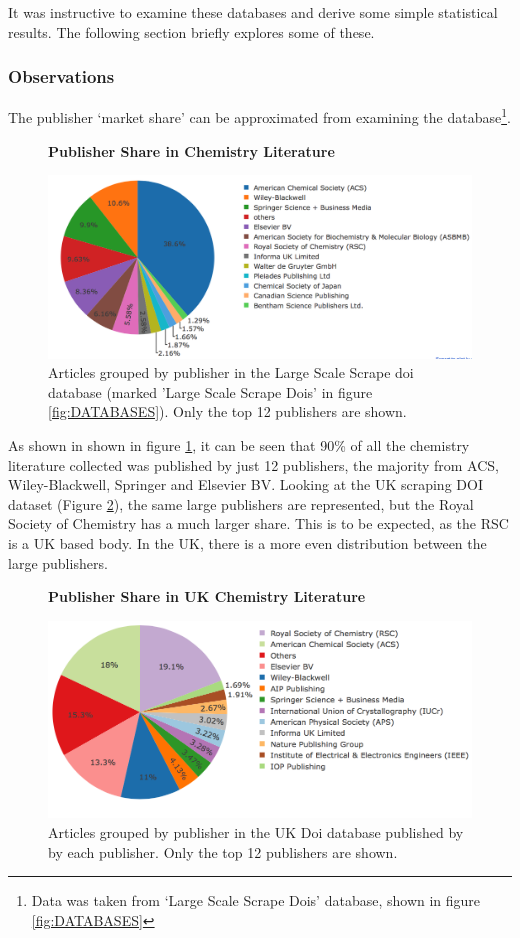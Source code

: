 It was instructive to examine these databases and derive some simple statistical results. The following section briefly explores some of these.
\subsubsection{Observations}
\label{sec:CORPUSOBSERVATIONS}
The publisher `market share' can be approximated from examining the database\footnote{Data was taken from `Large Scale Scrape Dois' database, shown in figure \ref{fig:DATABASES}}.
\begin{figure}[H]
    \centering
    \textbf{Publisher Share in Chemistry Literature}\par\medskip
    \includegraphics[width=\textwidth]{Data_Acquisition/publishers_pie.png}
    \caption[Publisher Share in Chemistry Literature]{Articles grouped by publisher in the Large Scale Scrape doi database (marked 'Large Scale Scrape Dois' in figure \ref{fig:DATABASES}). Only the top 12 publishers are shown.}
     \label{fig:PUBPI}
\end{figure}
As shown in  shown in figure \ref{fig:PUBPI}, it can be seen that 90\% of all the chemistry literature collected was published by just 12 publishers, the majority from ACS, Wiley-Blackwell, Springer and Elsevier BV. Looking at the UK scraping DOI dataset (Figure \ref{fig:UKPUBPI}), the same large publishers are represented, but the Royal Society of Chemistry has a much larger share. This is to be expected, as the RSC is a UK based body. In the UK, there is a more even distribution between the large publishers. 

\begin{figure}[H]
    \centering
    \textbf{Publisher Share in UK Chemistry Literature}\par\medskip
    \includegraphics[width=\textwidth]{Data_Acquisition/uk_publishers_pie.png}
    \caption[Publisher Share in UK Chemistry Literature]{Articles grouped by publisher in the UK Doi database published by by each publisher. Only the top 12 publishers are shown.}
     \label{fig:UKPUBPI}
\end{figure}

